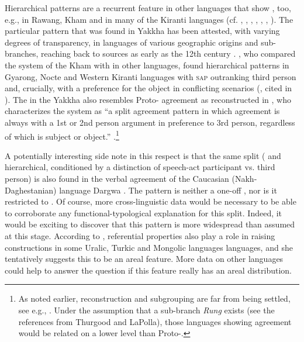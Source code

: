 Hierarchical patterns are a recurrent feature  in other  languages that show , too, e.g., in Rawang, Kham and in many of the Kiranti languages (cf. \citealt[317]{DeLancey1989Verb}, \citealt[311]{LaPolla1992Dating}, \citealt[30]{LaPolla2003_Overview}, \citealt{LaPolla2007Hierarchical}, \citealt[473]{Ebert1987Grammatical}, \citealt[1]{DeLancey2011_Notes}, \citealt[398]{Watters2002A-grammar}). The particular pattern that was found in Yakkha has been attested, with varying degrees of transparency, in  languages of various geographic origins and sub-branches, reaching back to  sources as early as the 12th century \citep{Kepping1975_Subject, Kepping1994The-conjugation}. \citet{Watters2002A-grammar}, who compared the  system of the Kham  with  in other  languages, found hierarchical patterns in Gyarong, Nocte and Western Kiranti languages with \textsc{sap} outranking third person and, crucially, with a preference for the object in conflicting scenarios (\citealt{Nagano1984A-historical}, cited in \citealt[388]{Watters2002A-grammar}). The  in the Yakkha  also resembles Proto- agreement as reconstructed in \citet{DeLancey1989Verb}, who characterizes the system as  “a split  agreement pattern in which agreement is always with a 1st or 2nd person argument in preference to 3rd person, regardless of which is subject or object.” \citep[317]{DeLancey1989Verb}.\footnote{As noted earlier,  reconstruction and subgrouping are far from being settled, see e.g., \citet{Thurgood1984The-Rung, DeLancey1989Verb, DeLancey2010_Towards, DeLancey2011_Notes, LaPolla1992Dating, LaPolla2012_Comments, Jacques2012_Agreement}. Under the assumption that  a sub-branch \emph{Rung} exists (see the references from Thurgood and LaPolla), those  languages showing agreement would be related on a lower level than Proto-.}


A potentially interesting side note in this respect is that the same  split ( and hierarchical, conditioned by a distinction of speech-act participant vs. third person) is also found in the verbal agreement of the Caucasian (Nakh-Daghestanian) language Dargwa \citep[208]{Zuniga2007_From}. The pattern is neither a one-off , nor is it restricted to . Of course, more cross-linguistic data would be necessary to be able to corroborate any functional-typo\-lo\-gic\-al explanation for this  split. Indeed, it would be exciting to discover that this pattern is more widespread than  assumed at this stage. According to \citet{Serdobolskaya2009_Raising}, referential properties also play a role  in raising constructions in some Uralic, Turkic and Mongolic languages languages, and she tentatively suggests this to be an areal feature. More data on other languages could help to answer the question if this feature really has an areal distribution.  


